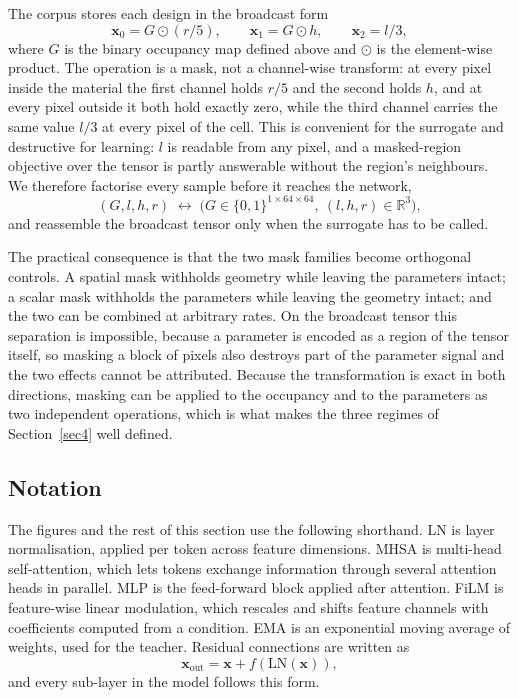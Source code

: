 \documentclass[pdflatex,oneside,sn-mathphys-num]{sn-jnl}
\theoremstyle{thmstyleone}
\theoremstyle{thmstyletwo}
\theoremstyle{thmstylethree}
\begin{document}
The corpus stores each design in the broadcast form
\begin{equation}
\mathbf{x}_0 = G\odot(r/5),\qquad
\mathbf{x}_1 = G\odot h,\qquad
\mathbf{x}_2 = l/3,
\end{equation}
where $G$ is the binary occupancy map defined above and $\odot$ is the element-wise
product. The operation is a mask, not a channel-wise transform: at every pixel inside the
material the first channel holds $r/5$ and the second holds $h$, and at every pixel outside
it both hold exactly zero, while the third channel carries the same value $l/3$ at every
pixel of the cell. This is convenient for the surrogate and destructive for learning: $l$ is readable
from any pixel, and a masked-region objective over the tensor is partly answerable without
the region's neighbours. We therefore factorise every sample before it reaches the network,
\begin{equation}
(G, l, h, r) \;\longleftrightarrow\;
\big(G\in\{0,1\}^{1\times64\times64},\ (l,h,r)\in\mathbb{R}^3\big),
\label{eq:fact}
\end{equation}
and reassemble the broadcast tensor only when the surrogate has to be called.

The practical consequence is that the two mask families become orthogonal
controls. A spatial mask withholds geometry while leaving the parameters intact;
a scalar mask withholds the parameters while leaving the geometry intact; and the
two can be combined at arbitrary rates. On the broadcast tensor this separation is
impossible, because a parameter is encoded as a region of the tensor itself, so
masking a block of pixels also destroys part of the parameter signal and the two
effects cannot be attributed. Because
the transformation is exact in both directions, masking can be applied to the occupancy
and to the parameters as two independent operations, which is what makes the three
regimes of Section~\ref{sec4} well defined.

\subsection{Notation}

The figures and the rest of this section use the following shorthand. LN is layer
normalisation, applied per token across feature dimensions. MHSA is multi-head
self-attention, which lets tokens exchange information through several attention heads in
parallel. MLP is the feed-forward block applied after attention. FiLM is feature-wise
linear modulation, which rescales and shifts feature channels with coefficients computed
from a condition. EMA is an exponential moving average of weights, used for the teacher.
Residual connections are written as
\begin{equation}
\mathbf{x}_{\mathrm{out}} = \mathbf{x} + f(\mathrm{LN}(\mathbf{x})),
\end{equation}
and every sub-layer in the model follows this form.
\end{document}
